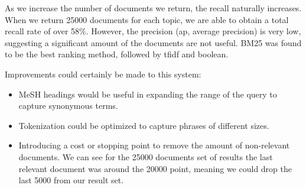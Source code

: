 \begin{table}[H]
\caption{Results for IR Pubmed system. Comparison for both 5000 and 25000 thresholds}
\end{table}


As we increase the number of documents we return, the recall naturally increases. When we return 25000 documents for each topic, we are able to obtain a total recall rate of over 58\%. However, the precision (ap, average precision) is very low, suggesting a significant amount of the documents are not useful. BM25 was found to be the best ranking method, followed by tfidf and boolean.

Improvements could certainly be made to this system:

\begin{itemize}
  \item MeSH headings would be useful in expanding the range of the query to capture synonymous terms. 
  \item Tokenization could be optimized to capture phrases of different sizes.
  \item Introducing a cost or stopping point to remove the amount of non-relevant documents. We can see for the 25000 documents set of results the last relevant document was around the 20000 point, meaning we could drop the last 5000 from our result set.
\end{itemize}


